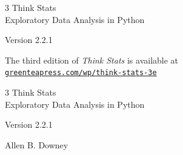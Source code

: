 \documentclass[12pt]{book}
\newcommand{\thetitle}{Think Stats}
\newcommand{\thesubtitle}{Exploratory Data Analysis in Python}
\newcommand{\theversion}{2.2.1}
\begin{document}
\begin{latexonly}

\renewcommand{\blankpage}{\thispagestyle{empty} \quad \newpage}



\thispagestyle{empty}

\begin{flushright}
\vspace*{2.0in}

\begin{spacing}{3}
{\huge \thetitle}\\
{\Large \thesubtitle}
\end{spacing}

\vspace{0.25in}

Version \theversion

\vfill

{\large The third edition of \emph{Think Stats} is available at\\
\href{https://greenteapress.com/wp/think-stats-3e/}{\nolinkurl{greenteapress.com/wp/think-stats-3e}}}

\end{flushright}


\blankpage
\blankpage

\pagebreak
\thispagestyle{empty}

\begin{flushright}
\vspace*{2.0in}

\begin{spacing}{3}
{\huge \thetitle}\\
{\Large \thesubtitle}
\end{spacing}

\vspace{0.25in}

Version \theversion

\vspace{1in}


{\Large
Allen B. Downey\\
}


\vspace{0.5in}


\end{flushright}
\end{latexonly}
\end{document}
